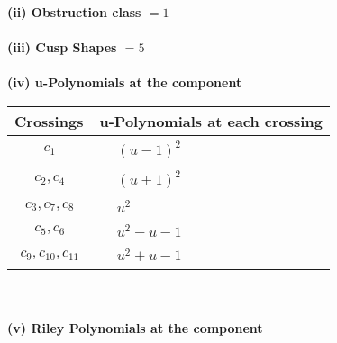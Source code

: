 \documentclass[1p]{elsarticle_modified}
\theoremstyle{definition}
\begin{document}
\flushleft \textbf{(ii) Obstruction class $= 1$}\\~\\
\flushleft \textbf{(iii) Cusp Shapes $= 5$}\\~\\
\newpage\renewcommand{\arraystretch}{1}
\flushleft \textbf{(iv) u-Polynomials at the component}\newline \\
\begin{tabular}{m{50pt}|m{274pt}}
Crossings & \hspace{64pt}u-Polynomials at each crossing \\
\hline $$\begin{aligned}c_{1}\end{aligned}$$&$\begin{aligned}
&(u-1)^2
\end{aligned}$\\
\hline $$\begin{aligned}c_{2},c_{4}\end{aligned}$$&$\begin{aligned}
&(u+1)^2
\end{aligned}$\\
\hline $$\begin{aligned}c_{3},c_{7},c_{8}\end{aligned}$$&$\begin{aligned}
&u^2
\end{aligned}$\\
\hline $$\begin{aligned}c_{5},c_{6}\end{aligned}$$&$\begin{aligned}
&u^2- u-1
\end{aligned}$\\
\hline $$\begin{aligned}c_{9},c_{10},c_{11}\end{aligned}$$&$\begin{aligned}
&u^2+u-1
\end{aligned}$\\
\hline
\end{tabular}\\~\\
\newpage\renewcommand{\arraystretch}{1}
\flushleft \textbf{(v) Riley Polynomials at the component}\newline \\
\end{document}
